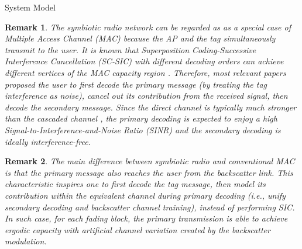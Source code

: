 \documentclass[journal]{IEEEtran}
\newtheorem{remark}{Remark}
\begin{document}
\begin{section}{System Model}
		\begin{remark}
			The symbiotic radio network can be regarded as as a special case of Multiple Access Channel (MAC) because the AP and the tag simultaneously transmit to the user. It is known that Superposition Coding-Successive Interference Cancellation (SC-SIC) with different decoding orders can achieve different vertices of the MAC capacity region \cite{Goldsmith2005}. Therefore, most relevant papers proposed the user to first decode the primary message (by treating the tag interference as noise), cancel out its contribution from the received signal, then decode the secondary message. Since the direct channel is typically much stronger than the cascaded channel \cite{Ozdogan2020}, the primary decoding is expected to enjoy a high Signal-to-Interference-and-Noise Ratio (SINR) and the secondary decoding is ideally interference-free.
		\end{remark}

		\begin{remark}
			The main difference between symbiotic radio and conventional MAC is that the primary message also reaches the user from the backscatter link. This characteristic inspires one to first decode the tag message, then model its contribution within the equivalent channel during primary decoding (i.e., unify secondary decoding and backscatter channel training), instead of performing SIC. In such case, for each fading block, the primary transmission is able to achieve ergodic capacity with artificial channel variation created by the backscatter modulation.
		\end{remark}


\end{section}
\end{document}
